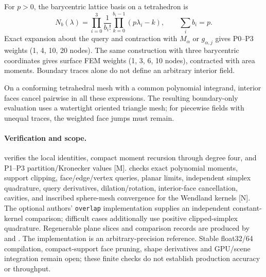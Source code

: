 For $p>0$, the barycentric lattice basis on a tetrahedron is
\[
 N_b(\lambda)=\prod_{i=0}^{3}\frac1{b_i!}
             \prod_{k=0}^{b_i-1}(p\lambda_i-k),\qquad \sum_i b_i=p.
\]
Exact expansion about the query and contraction with $M_\alpha$ or
$g_{\alpha,j}$ gives P0--P3 weights (1, 4, 10, 20 nodes).
The same construction with three barycentric coordinates gives surface FEM
weights (1, 3, 6, 10 nodes), contracted with area moments.
Boundary traces alone do not define an arbitrary interior field.

On a conforming tetrahedral mesh with a common polynomial integrand,
interior faces cancel pairwise in all these expressions. The resulting
boundary-only evaluation uses a watertight oriented triangle mesh; for
piecewise fields with unequal traces, the weighted face jumps must remain.

\paragraph{Verification and scope.}
 verifies the local identities, compact moment
recursion through degree four, and P1--P3 partition/Kronecker values [M].
 checks exact polynomial moments, support clipping,
face/edge/vertex queries, planar limits, independent simplex quadrature,
query derivatives, dilation/rotation, interior-face cancellation, cavities,
and inscribed sphere-mesh convergence for the Wendland kernels [N].
The optional authors' \texttt{overlap} implementation supplies an independent
constant-kernel comparison; difficult cases additionally use positive
clipped-simplex quadrature. Regenerable plane slices and comparison records
are produced by  and
.
The implementation is an arbitrary-precision reference. Stable float32/64
compilation, compact-support face pruning, shape derivatives and GPU/scene
integration remain open; these finite checks do not establish production
accuracy or throughput. 
